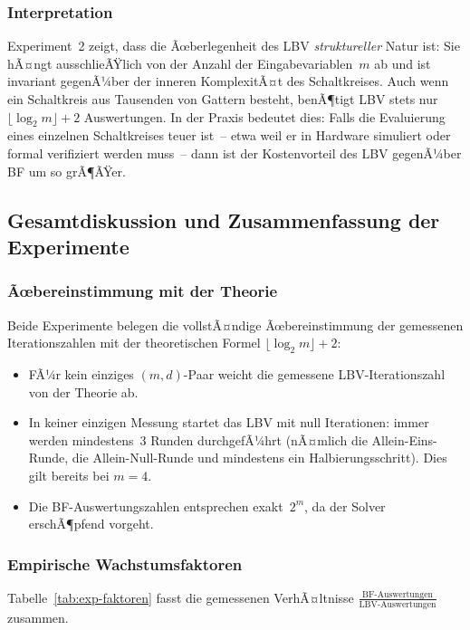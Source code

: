 ﻿\documentclass[a4paper,12pt]{article}
\theoremstyle{definition}
\begin{document}
\subsubsection{Interpretation}

Experiment~2 zeigt, dass die Ãœberlegenheit des LBV \emph{struktureller} Natur ist:
Sie hÃ¤ngt ausschlieÃŸlich von der Anzahl der Eingabevariablen~$m$ ab und ist invariant
gegenÃ¼ber der inneren KomplexitÃ¤t des Schaltkreises.  Auch wenn ein Schaltkreis aus
Tausenden von Gattern besteht, benÃ¶tigt LBV stets nur $\lfloor\log_2 m\rfloor + 2$
Auswertungen.  In der Praxis bedeutet dies: Falls die Evaluierung eines einzelnen
Schaltkreises teuer ist~-- etwa weil er in Hardware simuliert oder formal verifiziert
werden muss~-- dann ist der Kostenvorteil des LBV gegenÃ¼ber BF um so grÃ¶ÃŸer.

\subsection{Gesamtdiskussion und Zusammenfassung der Experimente}
\label{subsec:exp-zusammenfassung}

\subsubsection{Ãœbereinstimmung mit der Theorie}

Beide Experimente belegen die vollstÃ¤ndige Ãœbereinstimmung der gemessenen Iterationszahlen
mit der theoretischen Formel $\lfloor\log_2 m\rfloor + 2$:

\begin{itemize}
  \item FÃ¼r kein einziges $(m, d)$-Paar weicht die gemessene LBV-Iterationszahl von der
    Theorie ab.
  \item In keiner einzigen Messung startet das LBV mit null Iterationen: immer werden
    mindestens~3 Runden durchgefÃ¼hrt (nÃ¤mlich die Allein-Eins-Runde, die Allein-Null-Runde
    und mindestens ein Halbierungsschritt).  Dies gilt bereits bei $m = 4$.
  \item Die BF-Auswertungszahlen entsprechen exakt~$2^m$, da der Solver erschÃ¶pfend
    vorgeht.
\end{itemize}

\subsubsection{Empirische Wachstumsfaktoren}

Tabelle~\ref{tab:exp-faktoren} fasst die gemessenen VerhÃ¤ltnisse
$\frac{\text{BF-Auswertungen}}{\text{LBV-Auswertungen}}$ zusammen.
\end{document}
